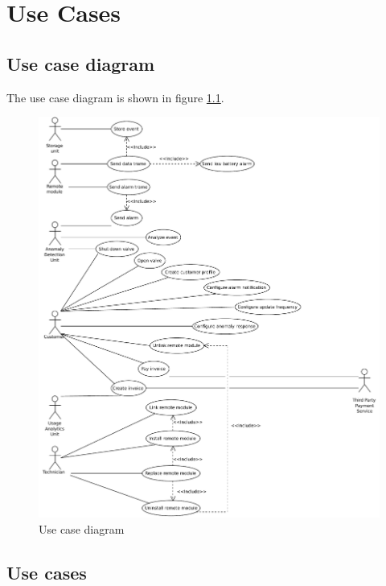\chapter{Use Cases}
\label{use-cases}

\section{Use case diagram}

\npar The use case diagram is shown in figure \ref{fig:use-case-diagram}. 

\begin{figure}[h]
	\begin{centering}
		\includegraphics[width=\textwidth]{figs/use-case-diagram.pdf}
		\caption{Use case diagram}
		\label{fig:use-case-diagram}
	\end{centering}
\end{figure}

\section{Use cases}

